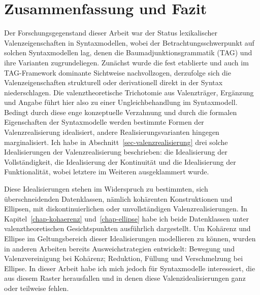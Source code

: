 \chapter{Zusammenfassung und Fazit} 

Der Forschungsgegenstand dieser Arbeit war der Status lexikalischer Valenzeigenschaften in Syntaxmodellen, wobei der Betrachtungsschwerpunkt auf solchen Syntaxmodellen lag, denen die Baumadjunktionsgrammatik (TAG) und ihre Varianten zugrundeliegen. Zunächst wurde die fest etablierte und auch im TAG-Framework dominante Sichtweise nachvollzogen, derzufolge sich die Valenzeigenschaften strukturell oder derivationell direkt in der Syntax niederschlagen. Die valenztheoretische Trichotomie aus Valenzträger, Ergänzung und Angabe führt hier also zu einer Ungleichbehandlung im Syntaxmodell. Bedingt durch diese enge konzeptuelle Verzahnung und durch die formalen Eigenschaften der Syntaxmodelle werden bestimmte Formen der Valenzrealisierung idealisiert, andere Realisierungsvarianten hingegen marginalisiert. Ich habe in Abschnitt~\ref{sec-valenzrealisierung} drei solche Idealisierungen der Valenzrealisierung beschrieben: die Idealisierung der Vollständigkeit, die Idealisierung der Kontinuität und die Idealisierung der Funktionalität, wobei letztere im Weiteren ausgeklammert wurde.

Diese Idealisierungen stehen im Widerspruch zu bestimmten, sich überschneidenden Datenklassen, nämlich kohärenten Konstruktionen und Ellipsen, mit diskontinuierlichen oder unvollständigen Valenzrealisierungen. In Kapitel~\ref{chap-kohaerenz} und~\ref{chap-ellipse} habe ich beide Datenklassen unter valenztheoretischen Gesichtspunkten ausführlich dargestellt. Um Kohärenz und Ellipse im Geltungsbereich dieser Idealisierungen modellieren zu können, wurden in anderen Arbeiten bereits Ausweichstrategien entwickelt: Bewegung und Valenzvereinigung bei Kohärenz; Reduktion, Füllung und Verschmelzung bei Ellipse. In dieser Arbeit habe ich mich jedoch für Syntaxmodelle interessiert, die aus diesem Raster herausfallen und in denen diese Valenzidealisierungen ganz oder teilweise fehlen.

